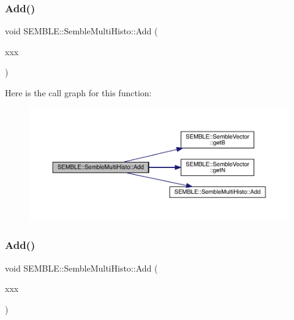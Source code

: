 \subsubsection{\texorpdfstring{Add()}{Add()}\hspace{0.1cm}{\footnotesize\ttfamily [3/4]}}
{\footnotesize\ttfamily void S\+E\+M\+B\+L\+E\+::\+Semble\+Multi\+Histo\+::\+Add (\begin{DoxyParamCaption}\item[{const \mbox{\hyperlink{structSEMBLE_1_1SembleVector}{Semble\+Vector}}$<$ double $>$ \&}]{xxx }\end{DoxyParamCaption})}

Here is the call graph for this function\+:
\nopagebreak
\begin{figure}[H]
\begin{center}
\leavevmode
\includegraphics[width=350pt]{d5/d58/structSEMBLE_1_1SembleMultiHisto_ac3f1fb8049db01afbfb7152bc98f7db3_cgraph}
\end{center}
\end{figure}
\mbox{\label{structSEMBLE_1_1SembleMultiHisto_ac3f1fb8049db01afbfb7152bc98f7db3}} 
\subsubsection{\texorpdfstring{Add()}{Add()}\hspace{0.1cm}{\footnotesize\ttfamily [4/4]}}
{\footnotesize\ttfamily void S\+E\+M\+B\+L\+E\+::\+Semble\+Multi\+Histo\+::\+Add (\begin{DoxyParamCaption}\item[{const \mbox{\hyperlink{structSEMBLE_1_1SembleVector}{Semble\+Vector}}$<$ double $>$ \&}]{xxx }\end{DoxyParamCaption})}

